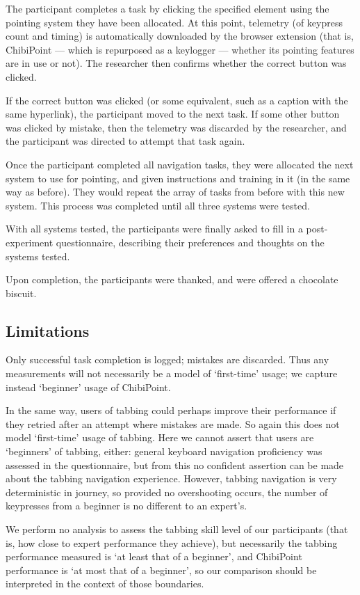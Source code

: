 \documentclass[a4paper, 12pt]{report}
\begin{document}
The participant completes a task by clicking the specified element using the pointing system they have been allocated. At this point, telemetry (of keypress count and timing) is automatically downloaded by the browser extension (that is, ChibiPoint --- which is repurposed as a keylogger --- whether its pointing features are in use or not). The researcher then confirms whether the correct button was clicked.

If the correct button was clicked (or some equivalent, such as a caption with the same hyperlink), the participant moved to the next task. If some other button was clicked by mistake, then the telemetry was discarded by the researcher, and the participant was directed to attempt that task again.

Once the participant completed all navigation tasks, they were allocated the next system to use for pointing, and given instructions and training in it (in the same way as before). They would repeat the array of tasks from before with this new system. This process was completed until all three systems were tested.

With all systems tested, the participants were finally asked to fill in a post-experiment questionnaire, describing their preferences and thoughts on the systems tested.

Upon completion, the participants were thanked, and were offered a chocolate biscuit.

\subsection{Limitations}
Only successful task completion is logged; mistakes are discarded. Thus any measurements will not necessarily be a model of `first-time' usage; we capture instead `beginner' usage of ChibiPoint.

In the same way, users of tabbing could perhaps improve their performance if they retried after an attempt where mistakes are made. So again this does not model `first-time' usage of tabbing. Here we cannot assert that users are `beginners' of tabbing, either: general keyboard navigation proficiency was assessed in the questionnaire, but from this no confident assertion can be made about the tabbing navigation experience. However, tabbing navigation is very deterministic in journey, so provided no overshooting occurs, the number of keypresses from a beginner is no different to an expert's.

We perform no analysis to assess the tabbing skill level of our participants (that is, how close to expert performance they achieve), but necessarily the tabbing performance measured is `at least that of a beginner', and ChibiPoint performance is `at most that of a beginner', so our comparison should be interpreted in the context of those boundaries.
\end{document}
